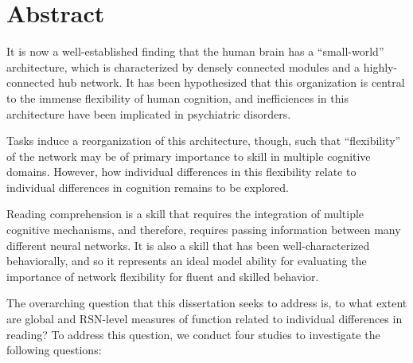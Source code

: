 \chapter{Abstract}


It is now a well-established finding that the human brain has a ``small-world'' architecture, which is characterized by densely connected modules and a highly-connected hub network. It has been hypothesized that this organization is central to the immense flexibility of human cognition, and inefficiences in this architecture have been implicated in psychiatric disorders. 

Tasks induce a reorganization of this architecture, though, such that ``flexibility'' of the network may be of primary importance to skill in multiple cognitive domains. However, how individual differences in this flexibility relate to individual differences in cognition remains to be explored.

Reading comprehension is a skill that requires the integration of multiple cognitive mechanisms, and therefore, requires passing information between many different neural networks. It is also a skill that has been well-characterized behaviorally, and so it represents an ideal model ability for evaluating the importance of network flexibility for fluent and skilled behavior.

The overarching question that this dissertation seeks to address is, to what extent are global and RSN-level measures of function related to individual differences in reading? To address this question, we conduct four studies to investigate the following questions:

